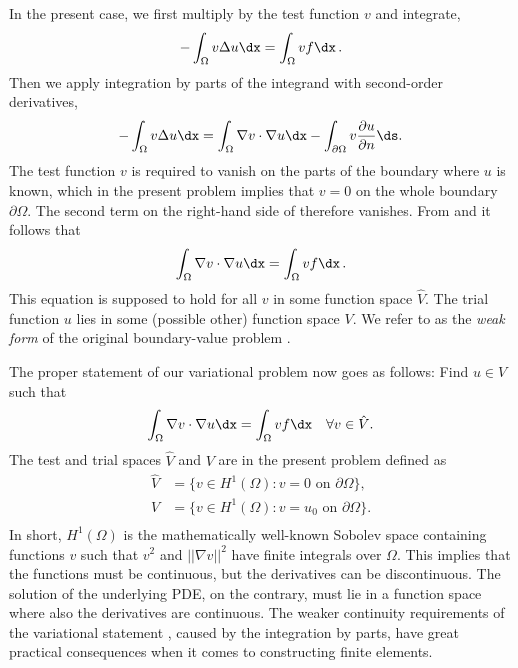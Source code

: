 In the present case, we first multiply by the test function $v$ and integrate,
\begin{equation}
\label{langtangen:poisson1:multbyv}
 -\int_\Omega v\Delta u \dx = \int_\Omega vf\dx\langtangenep\end{equation}
Then we apply integration by parts of the integrand with
second-order derivatives,
\begin{equation}
\label{langtangen:poisson1:eqbyparts}
 -\int_\Omega v\Delta u \dx
= \int_\Omega\nabla v\cdot\nabla u\dx - \int_{\partial\Omega}v{\partial u\over
\partial n}\ds .\end{equation}
The test function $v$ is required to vanish on the parts of the
boundary where $u$ is known, which in the present problem implies that
$v=0$ on the whole boundary $\partial\Omega$.
The second term on
the right-hand side of  therefore vanishes.
From  and 
it follows that
\begin{equation} \int_\Omega\nabla v\cdot\nabla u\dx = \int_\Omega vf\dx\langtangenep
\label{langtangen:poisson1:weak1}
\end{equation}
This equation is supposed to hold
for all $v$ in some function space $\hat V$. The trial function $u$
lies in some (possible other) function space $V$.
We refer to  as the \emph{weak form} of
the original boundary-value problem .

The proper statement of
our variational problem now goes as follows:
Find $u \in V$ such that
\begin{equation} \label{langtangen:poisson1:var}
  \int_{\Omega} \nabla v \cdot \nabla u \dx =
  \int_{\Omega} v f \dx
  \quad \forall v \in \hat{V}.
\end{equation}
The test and trial spaces $\hat{V}$ and $V$ are in the present
problem defined as
\begin{displaymath}
  \begin{split}
    \hat{V} &= \{v \in H^1(\Omega) : v = 0 \mbox{ on } \partial\Omega\}, \\
     V      &= \{v \in H^1(\Omega) : v = u_0 \mbox{ on } \partial\Omega\}. \\
  \end{split}
\end{displaymath}
In short,
$H^1(\Omega)$ is the mathematically well-known Sobolev space containing
functions $v$ such that $v^2$ and $||\nabla v||^2$ have finite integrals over
$\Omega$. This implies that the functions must be continuous, but the
derivatives can be discontinuous. The solution of the underlying
PDE, on the contrary,
must lie in a function space where also the derivatives are continuous.
The weaker continuity requirements of the variational statement
, caused by the integration by parts, have
great practical consequences when it comes to constructing
finite elements.

